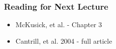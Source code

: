 \begin{frame}
  \frametitle{Reading for Next Lecture}

  \begin{itemize}
    \item McKusick, et al. - Chapter 3
    \item Cantrill, et al. 2004 - full article
  \end{itemize}
\end{frame}



